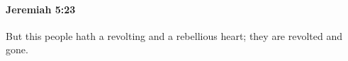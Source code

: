 
		\paragraph{Jeremiah 5:23} %
			\label{JEREMIAH-5-23}

			But this people hath a revolting and a rebellious heart; they are revolted and gone.


